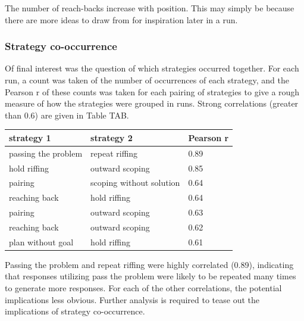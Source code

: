 The number of reach-backs increase with position. This may simply be because there are more ideas to draw from for inspiration later in a run.

\subsubsection{Strategy co-occurrence}

Of final interest was the question of which strategies occurred together. For each run, a count was taken of the number of occurrences of each strategy, and the Pearson r of these counts was taken for each pairing of strategies to give a rough measure of how the strategies were grouped in runs. Strong correlations (greater than 0.6) are given in Table TAB.

\begin{table}
    \begin{tabular}{l l l}
        \textbf{strategy 1} & \textbf{strategy 2} & \textbf{Pearson r} \\
        \hline
        passing the problem & repeat riffing & 0.89 \\
        hold riffing & outward scoping & 0.85 \\
        pairing & scoping without solution & 0.64 \\
        reaching back & hold riffing & 0.64 \\
        pairing & outward scoping & 0.63 \\
        reaching back & outward scoping & 0.62 \\
        plan without goal & hold riffing & 0.61 \\
    \end{tabular}
\end{table}

Passing the problem and repeat riffing were highly correlated (0.89), indicating that responses utilizing pass the problem were likely to be repeated many times to generate more responses. For each of the other correlations, the potential implications less obvious. Further analysis is required to tease out the implications of strategy co-occurrence.

